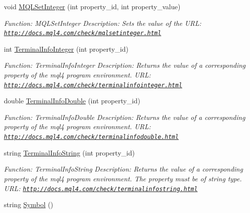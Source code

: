 \begin{DoxyCompactItemize}
void \hyperlink{class_m_q_l4_c_sharp_1_1_base_1_1_m_q_l_base_ab9da6054e055cb6ad2106550c93749e2}{M\+Q\+L\+Set\+Integer} (int property\+\_\+id, int property\+\_\+value)
\begin{DoxyCompactList}\small\item\em Function\+: M\+Q\+L\+Set\+Integer Description\+: Sets the value of the U\+RL\+: \href{http://docs.mql4.com/check/mqlsetinteger.html}{\tt http\+://docs.\+mql4.\+com/check/mqlsetinteger.\+html} \end{DoxyCompactList}\item 
int \hyperlink{class_m_q_l4_c_sharp_1_1_base_1_1_m_q_l_base_ae1322a0e7f9b8a1ee30797d49a0cd1ef}{Terminal\+Info\+Integer} (int property\+\_\+id)
\begin{DoxyCompactList}\small\item\em Function\+: Terminal\+Info\+Integer Description\+: Returns the value of a corresponding property of the mql4 program environment. U\+RL\+: \href{http://docs.mql4.com/check/terminalinfointeger.html}{\tt http\+://docs.\+mql4.\+com/check/terminalinfointeger.\+html} \end{DoxyCompactList}\item 
double \hyperlink{class_m_q_l4_c_sharp_1_1_base_1_1_m_q_l_base_a6aa8a3da59820883ed94a4d94f69ca59}{Terminal\+Info\+Double} (int property\+\_\+id)
\begin{DoxyCompactList}\small\item\em Function\+: Terminal\+Info\+Double Description\+: Returns the value of a corresponding property of the mql4 program environment. U\+RL\+: \href{http://docs.mql4.com/check/terminalinfodouble.html}{\tt http\+://docs.\+mql4.\+com/check/terminalinfodouble.\+html} \end{DoxyCompactList}\item 
string \hyperlink{class_m_q_l4_c_sharp_1_1_base_1_1_m_q_l_base_a986fc3f3d70c8e4608192ba0a69158b0}{Terminal\+Info\+String} (int property\+\_\+id)
\begin{DoxyCompactList}\small\item\em Function\+: Terminal\+Info\+String Description\+: Returns the value of a corresponding property of the mql4 program environment. The property must be of string type. U\+RL\+: \href{http://docs.mql4.com/check/terminalinfostring.html}{\tt http\+://docs.\+mql4.\+com/check/terminalinfostring.\+html} \end{DoxyCompactList}\item 
string \hyperlink{class_m_q_l4_c_sharp_1_1_base_1_1_m_q_l_base_ae69ded280dd5c3fcb5379d1276a5cdb3}{Symbol} ()

\end{DoxyCompactItemize}

